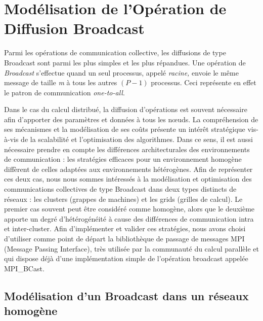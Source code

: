 \section{Modélisation de l'Opération de Diffusion Broadcast}

Parmi les opérations de communication collective, les diffusions de type Broadcast sont parmi les plus simples et les plus répandues. Une opération de \emph{Broadcast} s'effectue quand un seul processus,
appelé \emph{racine,} envoie le même message de taille \emph{m} à
tous les autres $(P-1)$ processus.  Ceci représente en effet le patron de communication \textit{one-to-all}. 

Dans le cas du calcul distribué, la diffusion d'opérations est souvent nécessaire afin d'apporter des paramètres et données à tous les n{\oe}uds.  La compréhension de ses mécanismes et la modélisation de ses coûts présente un intérêt stratégique vis-à-vis de la scalabilité et l'optimisation des algorithmes. Dans ce sens, il est aussi nécessaire prendre en compte les différences architecturales des environnements de communication : les stratégies efficaces pour un environnement homogène diffèrent de celles adaptées aux environnements hétérogènes. Afin de représenter ces deux cas, nous nous sommes intéressés à la modélisation et optimisation des communications collectives de type Broadcast dans deux types distincts de réseaux : les clusters (grappes de machines) et les grids (grilles de calcul). Le premier cas souvent peut être considéré comme homogène, alors que le deuxième apporte un degré d'hétérogénéité à cause des différences de communication intra et inter-cluster. Afin d'implémenter et valider ces stratégies, nous avons choisi d'utiliser comme point de départ la bibliothèque de passage de messages MPI (Message Passing Interface), très utilisée par la communauté du calcul parallèle et qui dispose déjà d'une implémentation simple de l'opération broadcast appelée MPI\_BCast.   

\subsection{\label{sec:Broadcast}Modélisation d'un Broadcast dans un réseaux homogène}

